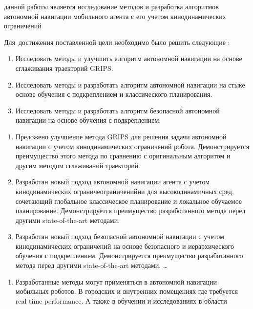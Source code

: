 
{\aim} данной работы является исследование методов и разработка алгоритмов
автономной навигации мобильного агента с его учетом кинодинамических ограничений

Для~достижения поставленной цели необходимо было решить следующие {\tasks}:
\begin{enumerate}[beginpenalty=10000] %
  \item Исследовать методы и улучшить алгоритм автономной навигации на основе сглаживания траекторий GRIPS.
  \item Исследовать методы и разработать алгоритм автономной навигации на стыке основе обучения с подкреплением и классического планирования.
  \item Исследовать методы и разработать алгоритм безопасной автономной навигации на основе обучения с подкреплением.
\end{enumerate}


{\novelty}
\begin{enumerate}[beginpenalty=10000] %
  \item Преложено улучшение метода GRIPS для решения задачи автономной навигации с учетом кинодинамических ограничений робота. 
  Демонстрируется преимущество этого метода по сравнению с оригинальным алгоритом и другим методом сглаживаний траекторий.
  \item Разработан новый подход автономной навигации агента с учетом кинодинамических ограничеограниченийни для высокодинамичных сред, сочетающий 
  глобальное классическое планирование и локальное обучаемое планирование. Демонстрируется преимущество разработанного метода перед другими 
  state-of-the-art методами. 
  \item Разработан новый подход безопасной автономной навигации с учетом кинодинамических ограничений на основе безопасного и иерархического
  обучения с подкреплением. Демонстрируется преимущество разработанного метода перед другими state-of-the-art методами. \ldots
\end{enumerate}

{\influence}
\begin{enumerate}[beginpenalty=10000]
    \item Разработанные методы могут применяться в автономной навигации мобильных роботов. В городских и внутренних помещениях где требуется
    real time performance. А также в обучении и исследованиях в области
\end{enumerate}

